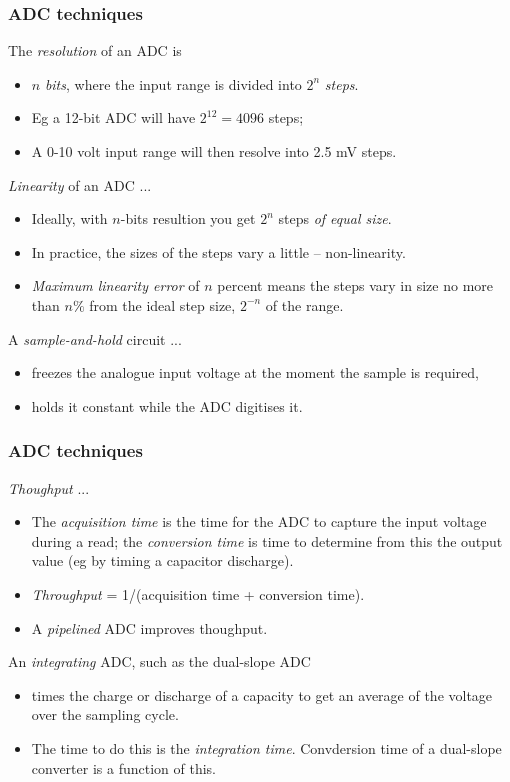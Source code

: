 \documentclass[10pt]{beamer}
\begin{document}
\begin{frame}
\frametitle{ADC techniques}
The \emph{resolution} of an ADC is
\begin{itemize}
\item $n$ \emph{bits}, where the input range is divided into $2^n$ \emph{steps}.
\item Eg a 12-bit ADC will have $2^{12} = 4096$ steps;
\item A 0-10 volt input range will then resolve into 2.5 mV steps.
\end{itemize}

\emph{Linearity} of an ADC ...
\begin{itemize}
\item Ideally, with $n$-bits resultion you get $2^n$ steps \emph{of equal size}.
\item In practice, the sizes of the steps vary a little -- non-linearity.
\item \emph{Maximum linearity error} of $n$ percent means the steps vary in size no more than $n \%$ from the ideal step size, $2^{-n}$ of the range.
\end{itemize}

A \emph{sample-and-hold} circuit ...
\begin{itemize}
\item freezes the analogue input voltage at the moment the sample is required,
\item holds it constant while the ADC digitises it.
\end{itemize}
\end{frame}

\begin{frame}
\frametitle{ADC techniques}
\emph{Thoughput} ...
\begin{itemize}
\item The \emph{acquisition time} is the time for the ADC to capture the input voltage during a read; the \emph{conversion time} is time to determine from this the output value (eg by timing a capacitor discharge).
\item \emph{Throughput} = 1/(acquisition time + conversion time).
\item A \emph{pipelined} ADC improves thoughput.
\end{itemize}

An \emph{integrating} ADC, such as the dual-slope ADC
\begin{itemize}
\item times the charge or discharge of a capacity to get an average of the voltage over the sampling cycle.
\item The time to do this is the \emph{integration time}. Convdersion time of a dual-slope converter is a function of this.
\end{itemize}
\end{frame}
\end{document}
